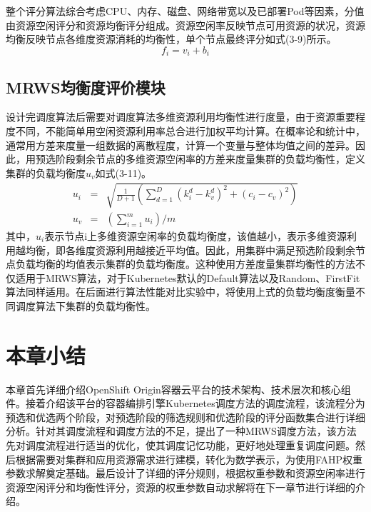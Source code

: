 整个评分算法综合考虑CPU、内存、磁盘、网络带宽以及已部署Pod等因素，分值由资源空闲评分和资源均衡评分组成。资源空闲率反映节点可用资源的状况，资源均衡反映节点各维度资源消耗的均衡性，单个节点最终评分如式(3-9)所示。
\begin{equation}
f_{i} = v_{i}+b_{i}
\end{equation}

\subsection{MRWS均衡度评价模块}
设计完调度算法后需要对调度算法多维资源利用均衡性进行度量，由于资源重要程度不同，不能简单用空闲资源利用率总合进行加权平均计算。在概率论和统计中，通常用方差来度量一组数据的离散程度，计算一个变量与整体均值之间的差异。因此，用预选阶段剩余节点的多维资源空闲率的方差来度量集群的负载均衡性，定义集群的负载均衡度$u_{v}$如式(3-11)。
\begin{eqnarray}
	u_{i} &=& \sqrt{\frac{1}{D+1}(\sum_{d=1}^{D}(k_{i}^{d}-k_{v}^{d})^{2}+(c_{i}-c_{v})^{2})} \\[0.3cm]
	u_{v} &=& (\sum_{i=1}^{m}u_{i})/m
\end{eqnarray}
其中，\begin{math}u_{i}\end{math}表示节点i上多维资源空闲率的负载均衡度，该值越小，表示多维资源利用越均衡，即各维度资源利用越接近平均值。因此，用集群中满足预选阶段剩余节点负载均衡的均值表示集群的负载均衡度。这种使用方差度量集群均衡性的方法不仅适用于MRWS算法，对于Kubernetes默认的Default算法以及Random、FirstFit算法同样适用。在后面进行算法性能对比实验中，将使用上式的负载均衡度衡量不同调度算法下集群的负载均衡性。

\section{本章小结}
本章首先详细介绍OpenShift Origin容器云平台的技术架构、技术层次和核心组件。接着介绍该平台的容器编排引擎Kubernetes调度方法的调度流程，该流程分为预选和优选两个阶段，对预选阶段的筛选规则和优选阶段的评分函数集合进行详细分析。针对其调度流程和调度方法的不足，提出了一种MRWS调度方法，该方法先对调度流程进行适当的优化，使其调度记忆功能，更好地处理重复调度问题。然后根据需要对集群和应用资源需求进行建模，转化为数学表示，为使用FAHP权重参数求解奠定基础。最后设计了详细的评分规则，根据权重参数和资源空闲率进行资源空闲评分和均衡性评分，资源的权重参数自动求解将在下一章节进行详细的介绍。




